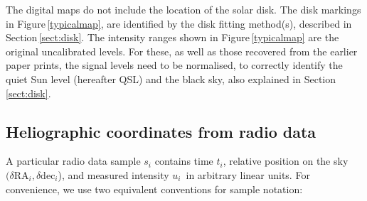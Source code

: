 \documentclass{aa}
\begin{document}
  The digital maps do not include the location of the solar disk.
  The disk markings in Figure\,\ref{typicalmap}, are identified by the 
  disk fitting method(s), described in Section\,\ref{sect:disk}.
  The intensity ranges shown in Figure\,\ref{typicalmap} are the original
  uncalibrated levels.
  For these, as well as those recovered from the earlier paper prints, the 
  signal levels need to be normalised, to correctly identify the 
  quiet Sun level (hereafter QSL) and the
  black sky, also explained in Section\,\ref{sect:disk}.



\subsection{Heliographic coordinates from radio data}

A particular radio data sample $s_i$ contains time $t_i$, relative position on the sky $(\delta \mathrm{RA}_i, \delta 
\mathrm{dec}_i$), and measured intensity $u_i$ in arbitrary linear units. For convenience, we use two equivalent 
conventions for sample notation:
\end{document}
